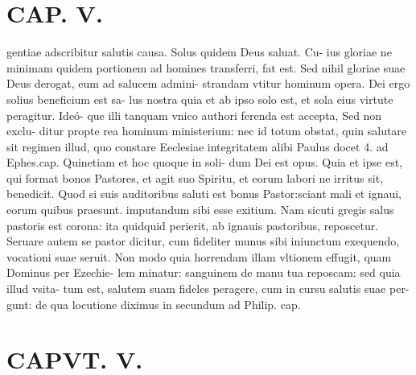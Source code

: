 \documentclass{article}
\begin{document}
\begin{pages}
\section*{CAP. V. }
\marginpar{[ p.55 ]}\pstart gentiae adscribitur salutis causa. Solus quidem Deus saluat. Cu- ius gloriae ne minimam quidem portionem ad homines transferri, fat est. Sed nihil gloriae suae Deus derogat, eum ad salucem admini- strandam vtitur hominum opera. Dei ergo solius beneficium est sa- lus nostra quia et ab ipso solo est, et sola eius virtute peragitur. Ideó- que illi tanquam vnico authori ferenda est accepta, Sed non exclu- ditur propte rea hominum ministerium: nec id totum obstat, quin salutare sit regimen illud, quo constare Eeclesiae integritatem alibi Paulus docet 4. ad Ephes.cap. Quinetiam et hoc quoque in soli- dum Dei est opus. Quia et ipse est, qui format bonos Pastores, et agit suo Spiritu, et eorum labori ne irritus sit, benedicit. Quod si suis auditoribus saluti est bonus Pastor:sciant mali et ignaui, eorum quibus praesunt. imputandum sibi esse exitium. Nam sicuti gregis salus pastoris est corona: ita quidquid perierit, ab ignauis pastoribus, reposcetur. Seruare autem se pastor dicitur, cum fideliter munus sibi iniunctum exequendo, vocationi suae seruit. Non modo quia horrendam illam vltionem effugit, quam Dominus per Ezechie- lem minatur: sanguinem de manu tua reposcam: sed quia illud vsita- tum est, salutem suam fideles peragere, cum in cursu salutis suae per- gunt: de qua locutione diximus in secundum ad Philip. cap.  \pend
\endnumbering\beginnumbering\section{CAPVT. V.}
{}

\end{pages}
\end{document}
